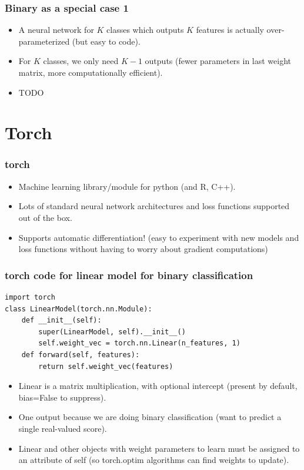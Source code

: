 \documentclass{beamer}
\begin{document}
\begin{frame}
  \frametitle{Binary as a special case 1}

  \begin{itemize}
  \item A neural network for $K$ classes which outputs $K$ features is
    actually over-parameterized (but easy to code).
  \item For $K$ classes, we only need $K-1$ outputs (fewer parameters
    in last weight matrix, more computationally efficient).
  \item TODO
  \end{itemize}
  
\end{frame}



\section{Torch}

\begin{frame}
  \frametitle{torch}
  \begin{itemize}
  \item Machine learning library/module for python (and R, C++).
  \item Lots of standard neural network architectures and loss
    functions supported out of the box.
  \item Supports automatic differentiation! (easy to experiment with
    new models and loss functions without having to worry about
    gradient computations)
  \end{itemize}
\end{frame}

\begin{frame}[fragile]
  \frametitle{torch code for linear model for binary classification}
\begin{verbatim}
import torch
class LinearModel(torch.nn.Module):
    def __init__(self):
        super(LinearModel, self).__init__()
        self.weight_vec = torch.nn.Linear(n_features, 1)
    def forward(self, features):
        return self.weight_vec(features)
\end{verbatim}

  \begin{itemize}
  \item Linear is a matrix multiplication, with optional intercept
    (present by default, bias=False to suppress).
  \item One output because we are doing binary classification (want to
    predict a single real-valued score).
  \item Linear and other objects with weight parameters to learn must
    be assigned to an attribute of self (so torch.optim algorithms can
    find weights to update).
  \end{itemize}
\end{frame}
\end{document}
